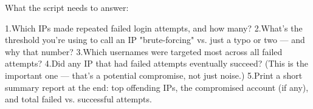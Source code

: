 What the script needs to answer:

1.Which IPs made repeated failed login attempts, and how many?
2.What's the threshold you're using to call an IP "brute-forcing" vs. just a typo or two — and why that number?
3.Which usernames were targeted most across all failed attempts?
4.Did any IP that had failed attempts eventually succeed? 
(This is the important one — that's a potential compromise, not just noise.)
5.Print a short summary report at the end: top offending IPs,
the compromised account (if any), and total failed vs. successful attempts.